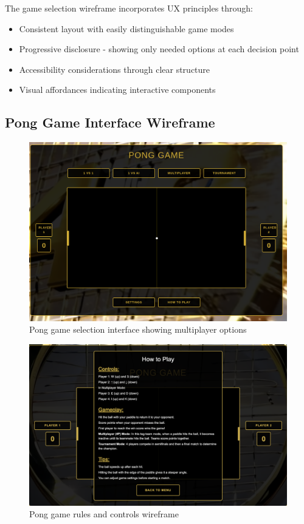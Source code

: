 The game selection wireframe incorporates UX principles through:
\begin{itemize}
    \item Consistent layout with easily distinguishable game modes
    \item Progressive disclosure - showing only needed options at each decision point
    \item Accessibility considerations through clear structure
    \item Visual affordances indicating interactive components
\end{itemize}

\subsection{Pong Game Interface Wireframe}

\begin{figure}[H]
    \centering
    \includegraphics[width=0.7\linewidth]{Figures/images/new_images/GamePage.png}
    \caption{Pong game selection interface showing multiplayer options}
    \label{fig:wireframe-game-interface}
\end{figure}

\begin{figure}[H]
    \centering
    \includegraphics[width=0.7\linewidth]{Figures/images/new_images/GameHowToPlay.png}
    \caption{Pong game rules and controls wireframe}
    \label{fig:wireframe-game-rules}
\end{figure}

